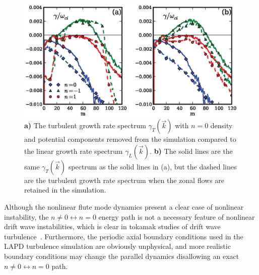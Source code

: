 \documentclass[showpacs,preprintnumbers,amsmath,amssymb,superscriptaddress]{revtex4}
\begin{document}
\begin{figure}[!htbp]
\includegraphics[]{no_n0_growthrates}
\hfil
\caption{\textbf{a)} The turbulent growth rate spectrum $\gamma_T(\vec{k})$ with $n=0$ density and potential components removed from the 
simulation compared to the linear growth rate spectrum $\gamma_L(\vec{k})$.
\textbf{b)} The solid lines are the same $\gamma_T(\vec{k})$ spectrum as the solid lines in (a), but the dashed lines are the turbulent growth rate spectrum when the zonal flows are retained
in the simulation.}
\label{gamma_no_n0_figs}
\end{figure}


Although the nonlinear flute mode dynamics present a clear case of nonlinear instability, the $n \ne 0 \leftrightarrow n=0$ energy path is not a necessary feature of nonlinear drift wave
instabilities, which is clear in tokamak studies of drift wave turbulence~\cite{zeiler1996,zeiler1997,scott2002,scott2003,scott2005}. Furthermore, the periodic axial boundary conditions
used in the LAPD turbulence simulation are obviously unphysical, and more realistic boundary conditions may change the parallel dynamics disallowing an exact $n \ne 0 \leftrightarrow n=0$ path.
\end{document}
